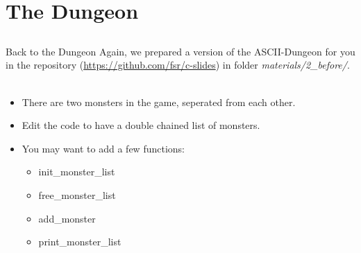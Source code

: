 \section{The Dungeon}
\subsection{}

\begin{frame}{Back to the Dungeon}
	Again, we prepared a version of the ASCII-Dungeon for you in the repository (\url{https://github.com/fsr/c-slides}) in folder \textit{materials/2\_before/}.\\
	\ \\
	
	\begin{itemize}
		\item There are two monsters in the game, seperated from each other.
		\item Edit the code to have a double chained list of monsters.
		\item You may want to add a few functions:
		\begin{itemize}
			\item init\_monster\_list
			\item free\_monster\_list
			\item add\_monster
			\item print\_monster\_list
		\end{itemize}
	\end{itemize}

\end{frame}



